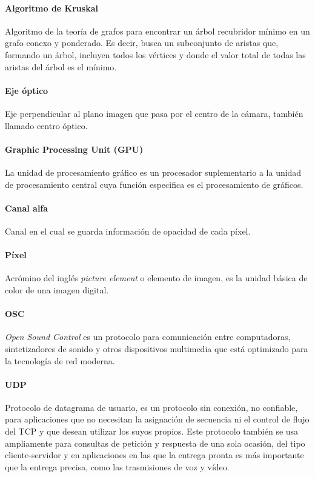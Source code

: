 \paragraph{Algoritmo de Kruskal}
Algoritmo de la teoría de grafos para encontrar un árbol recubridor mínimo en un grafo conexo y ponderado. Es decir, busca un subconjunto de aristas que, formando un árbol, incluyen todos los vértices y donde el valor total de todas las aristas del árbol es el mínimo.

\paragraph{Eje óptico}
Eje perpendicular al plano imagen que pasa por el centro de la cámara, también llamado centro óptico\cite{OpticalDesign}.

\paragraph{Graphic Processing Unit (GPU)}
La unidad de procesamiento gráfico es un procesador suplementario a la unidad de procesamiento central cuya función especifica es el procesamiento de gráficos\cite{GPUWork}.

\paragraph{Canal alfa}
Canal en el cual se guarda información de opacidad de cada píxel\cite{3DGraphics}.

\paragraph{Píxel}
Acrómino del inglés \emph{picture element} o elemento de imagen, es la unidad básica de color de una imagen digital.

\paragraph{OSC}
\emph{Open Sound Control} es un protocolo para comunicación entre computadoras, sintetizadores de sonido y otros dispositivos multimedia que está optimizado para la tecnología de red moderna\cite{OSCProtocol}.

\paragraph{UDP}
Protocolo de datagrama de usuario, es un protocolo sin conexión, no confiable, para aplicaciones que no necesitan la asignación de secuencia ni el control de flujo del TCP y que desean utilizar los suyos propios. Este protocolo también se usa ampliamente para consultas de petición y respuesta de una sola ocasión, del tipo cliente-servidor y en aplicaciones en las que la entrega pronta es más importante que la entrega precisa, como las trasmisiones de voz y vídeo\cite{Tanenbaum}.